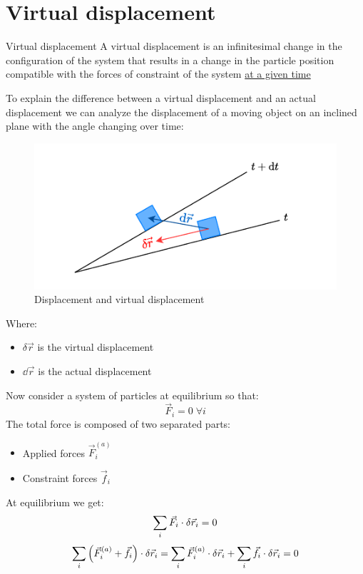 \section{Virtual displacement}
\begin{definition}{Virtual displacement}
  A virtual displacement is an infinitesimal change in the configuration of the system that results in a change in the particle position compatible with the forces of constraint of the system \underline{at a given time}
\end{definition}
To explain the difference between a virtual displacement and an actual displacement we can analyze the displacement of a moving object on an inclined plane with the angle changing over time:
\begin{figure}[H]
  \centering
  \includegraphics[width=0.5\linewidth]{res/svg/virtualdisplacement.drawio}
  \caption{Displacement and virtual displacement}
  \label{fig:image8}
\end{figure}
Where:
\begin{itemize}
    \item $\delta \vec{r}$ is the virtual displacement
    \item $\dd{\vec{r}}$ is the actual displacement
\end{itemize}
Now consider a system of particles at equilibrium so that:
\begin{equation}
    \vec{F}_i = 0\;\forall i
\end{equation}
The total force is composed of two separated parts:
\begin{itemize}
    \item Applied forces $\vec{F}^{(a)}_i$
    \item Constraint forces $\vec{f}_i$
\end{itemize}
At equilibrium we get:
\begin{equation}
    \displaystyle\sum_i \vec{F}_i \cdot \delta \vec{r}_i = 0
\end{equation}
\begin{equation}
    \displaystyle\sum_i \left(\vec{F}^{(a)}_i + \vec{f}_i\right) \cdot \delta \vec{r}_i = \displaystyle\sum_i \vec{F}^{(a)}_i \cdot \delta \vec{r}_i + \displaystyle\sum_i \vec{f}_i \cdot \delta \vec{r}_i = 0
\end{equation}
